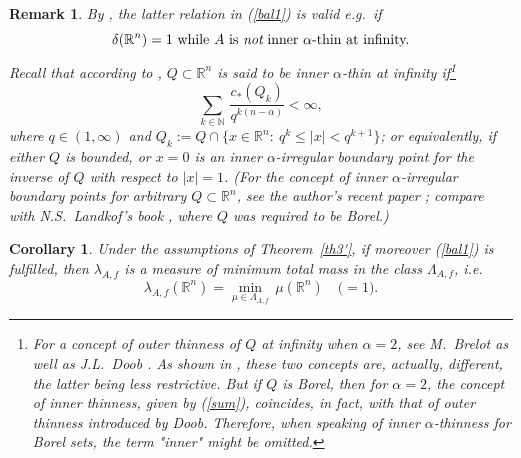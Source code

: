 \documentclass[12pt,a4paper,reqno]{amsart} %
\theoremstyle{lause}
\theoremstyle{maaritelma}
\theoremstyle{lause}
\newtheorem{corollary}[theorem]{Corollary}
\theoremstyle{maaritelma}
\newtheorem{remark}[theorem]{Remark}
\numberwithin{equation}{section}
\begin{document}
\begin{remark}
By \cite[Corollary~5.3]{Z-bal2}, the latter relation in (\ref{bal1}) is valid e.g.\ if
\[\delta(\mathbb R^n)=1\text{\ while $A$ is {\it not} inner $\alpha$-thin at infinity.}\]
Recall that according to  \cite{KM,Z-bal2}, $Q\subset\mathbb R^n$ is said to be {\it inner $\alpha$-thin at infinity} if\footnote{For a concept of {\it outer} thinness of $Q$ at infinity when $\alpha=2$, see M.~Brelot \cite[p.~313]{Brelot} as well as J.L.~Doob \cite[pp.~175--176]{Doob}. As shown in \cite[Remark~2.3]{Z-bal2}, these two concepts are, actually, different, the latter being less restrictive. But if $Q$ is Borel, then for $\alpha=2$, the concept of inner thinness, given by (\ref{sum}), coincides, in fact, with that of outer thinness introduced by Doob. Therefore, when speaking of inner $\alpha$-thinness for Borel sets, the term "inner" might be omitted.}
 \begin{equation}\label{sum}
 \sum_{k\in\mathbb N}\,\frac{c_*(Q_k)}{q^{k(n-\alpha)}}<\infty,
 \end{equation}
where $q\in(1,\infty)$ and $Q_k:=Q\cap\{x\in\mathbb R^n:\ q^k\leqslant|x|<q^{k+1}\}$; or equivalently, if either $Q$ is bounded, or  $x=0$ is an inner $\alpha$-irregular boundary point for the inverse of $Q$ with respect to $|x|=1$. (For the concept of inner $\alpha$-irregular boundary points for arbitrary $Q\subset\mathbb R^n$, see the author's recent paper \cite[Section~6]{Z-bal}; compare with N.S.~Landkof's book \cite[Section~V.1]{L}, where $Q$ was required to be Borel.)
\end{remark}

\begin{corollary}\label{cortm}
Under the assumptions of Theorem~{\rm\ref{th3'}}, if moreover {\rm(\ref{bal1})} is fulfilled,
 then $\lambda_{A,f}$ is a measure of minimum total mass in the class $\Lambda_{A,f}$, i.e.
\begin{equation}\label{eq-t-m}\lambda_{A,f}(\mathbb R^n)=\min_{\mu\in\Lambda_{A,f}}\,\mu(\mathbb R^n)\quad\bigl({}=1\bigr).\end{equation}
\end{corollary}
\end{document}
